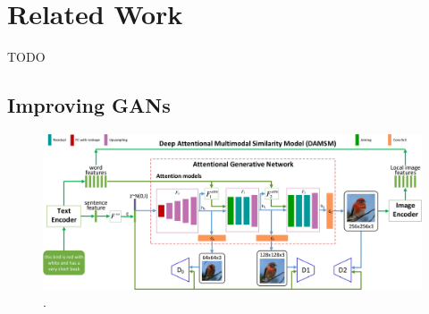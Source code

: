 \documentclass[letterpaper]{article} %
\begin{document}
%
%
%

\section{Related Work}
TODO

\subsection{Improving GANs}
\cite{attngan}
\begin{figure}[htbp]
\centerline{\includegraphics[width=0.95\linewidth]{attngan.png}}
\caption{.}
\label{fig:attngan}
\end{figure}
\end{document}
